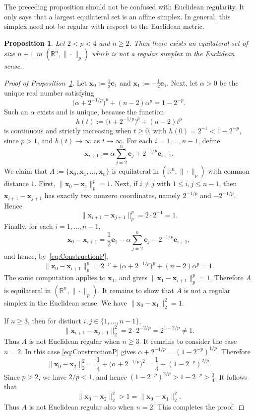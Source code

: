 \documentclass[11pt]{article}
\newtheorem{prop}[theorem]{Proposition}
\theoremstyle{definition}
\begin{document}
The preceding proposition should not be confused with Euclidean regularity. It only says that a largest equilateral set is an affine simplex. In general, this simplex need not be regular with respect to the Euclidean metric.
\begin{prop}\label{prop:nonregular-largest-general-n}
Let $2<p<4$ and $n\ge 2$.
Then there exists an equilateral set of size $n+1$ in $(\mathbb R^n,\|\cdot\|_p)$
which is not a regular simplex in the Euclidean sense.
\end{prop}
\begin{proof}[Proof of Proposition~\ref{prop:nonregular-largest-general-n}]
Let \( \boldsymbol{x}_0:=\frac12\boldsymbol{e}_1 \) and \( \boldsymbol{x}_1:=-\frac12\boldsymbol{e}_1. \) Next, let $\alpha>0$ be the unique real number satisfying \begin{equation}\label{eq:ConstructionP} \bigl(\alpha+2^{-1/p}\bigr)^p+(n-2)\alpha^p=1-2^{-p}. \end{equation} Such an $\alpha$ exists and is unique, because the function \[ h(t):=\bigl(t+2^{-1/p}\bigr)^p+(n-2)t^p \] is continuous and strictly increasing when \(t\ge 0\), with \(h(0)=2^{-1}<1-2^{-p}, \) since \(p>1\), and \(h(t)\to\infty\) as \(t\to\infty\). For each \(i=1,\ldots,n-1\), define \[ \boldsymbol{x}_{i+1} := \alpha\sum_{j=2}^{n}\boldsymbol{e}_j + 2^{-1/p}\boldsymbol{e}_{i+1}. \] We claim that \( A:=\{\boldsymbol{x}_0,\boldsymbol{x}_1,\dots,\boldsymbol{x}_n\} \) is equilateral in \((\mathbb R^n,\|\cdot\|_p)\) with common distance \(1\). First, \( \|\boldsymbol{x}_0-\boldsymbol{x}_1\|_p^p=1. \) Next, if \(i\neq j\) with \(1\le i,j\le n-1\), then \(\boldsymbol{x}_{i+1}-\boldsymbol{x}_{j+1}\) has exactly two nonzero coordinates, namely \(2^{-1/p}\) and \(-2^{-1/p}\). Hence \[ \|\boldsymbol{x}_{i+1}-\boldsymbol{x}_{j+1}\|_p^p = 2\cdot 2^{-1} = 1. \] Finally, for each \(i=1,\ldots,n-1\), \[ \boldsymbol{x}_0-\boldsymbol{x}_{i+1} = \frac12\boldsymbol{e}_1 - \alpha\sum_{j=2}^{n}\boldsymbol{e}_j - 2^{-1/p}\boldsymbol{e}_{i+1}, \] and hence, by~\eqref{eq:ConstructionP}, \[ \|\boldsymbol{x}_0-\boldsymbol{x}_{i+1}\|_p^p = 2^{-p} + \bigl(\alpha+2^{-1/p}\bigr)^p + (n-2)\alpha^p = 1. \] The same computation applies to \(\boldsymbol{x}_1\), and gives \( \|\boldsymbol{x}_1-\boldsymbol{x}_{i+1}\|_p^p=1. \) Therefore \(A\) is equilateral in \((\mathbb R^n,\|\cdot\|_p)\). It remains to show that \(A\) is not a regular simplex in the Euclidean sense. We have \( \|\boldsymbol{x}_0-\boldsymbol{x}_1\|_2^2=1. \)

If \(n\ge3\), then for distinct \(i,j\in\{1,\dots,n-1\}\), \[ \|\boldsymbol{x}_{i+1}-\boldsymbol{x}_{j+1}\|_2^2 = 2\cdot 2^{-2/p} = 2^{1-2/p} \ne 1. \] Thus \(A\) is not Euclidean regular when \(n\ge3\). It remains to consider the case \(n=2\). In this case \eqref{eq:ConstructionP} gives \( \alpha+2^{-1/p} = (1-2^{-p})^{1/p}. \) Therefore \[ \|\boldsymbol{x}_0-\boldsymbol{x}_2\|_2^2 = \frac14+\bigl(\alpha+2^{-1/p}\bigr)^2 = \frac14+(1-2^{-p})^{2/p}. \] Since \(p>2\), we have \(2/p<1\), and hence \( (1-2^{-p})^{2/p}>1-2^{-p}>\frac34. \) It follows that \[ \|\boldsymbol{x}_0-\boldsymbol{x}_2\|_2^2>1 = \|\boldsymbol{x}_0-\boldsymbol{x}_1\|_2^2. \] Thus \(A\) is not Euclidean regular also when \(n=2\). This completes the proof.
\end{proof}
\end{document}
